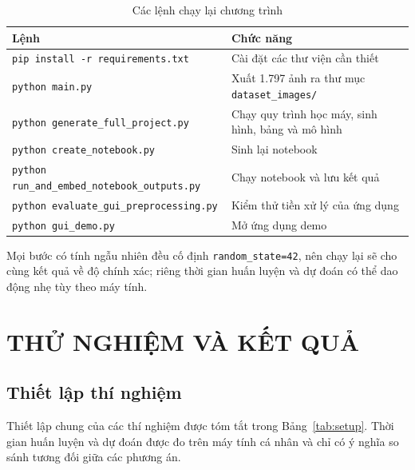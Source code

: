 \documentclass[a4paper,oneside]{report}
\begin{document}
\begin{table}[H]
\centering
\caption{Các lệnh chạy lại chương trình}
\label{tab:run}
\small
\begin{tabularx}{\textwidth}{@{}>{\raggedright\arraybackslash}p{8.3cm}L@{}}
\toprule
\textbf{Lệnh} & \textbf{Chức năng} \\
\midrule
\texttt{pip install -r requirements.txt} & Cài đặt các thư viện cần thiết \\
\texttt{python main.py} & Xuất 1.797 ảnh ra thư mục \mbox{\texttt{dataset\_images/}} \\
\texttt{python generate\_full\_project.py} & Chạy quy trình học máy, sinh hình, bảng và mô hình \\
\texttt{python create\_notebook.py} & Sinh lại notebook \\
\texttt{python run\_and\_embed\_notebook\_outputs.py} & Chạy notebook và lưu kết quả \\
\texttt{python evaluate\_gui\_preprocessing.py} & Kiểm thử tiền xử lý của ứng dụng \\
\texttt{python gui\_demo.py} & Mở ứng dụng demo \\
\bottomrule
\end{tabularx}
\end{table}

Mọi bước có tính ngẫu nhiên đều cố định \texttt{random\_state=42}, nên chạy lại sẽ cho cùng kết quả về độ chính
xác; riêng thời gian huấn luyện và dự đoán có thể dao động nhẹ tùy theo máy tính.

\chapter{THỬ NGHIỆM VÀ KẾT QUẢ}

\section{Thiết lập thí nghiệm}

Thiết lập chung của các thí nghiệm được tóm tắt trong Bảng~\ref{tab:setup}. Thời gian huấn luyện và dự đoán được
đo trên máy tính cá nhân và chỉ có ý nghĩa so sánh tương đối giữa các phương án.
\end{document}
